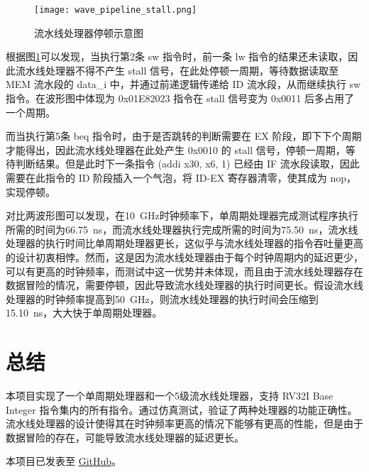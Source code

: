 \documentclass[lang=zh]{sjtuarticle}	%
\begin{document}
\begin{figure}[!htp]
	\centering
	\texttt{[image: wave\_pipeline\_stall.png]}
	\caption{流水线处理器停顿示意图}
	\label{fig:pipeline_stall}
\end{figure}

根据图\ref{fig:pipeline_stall}可以发现，当执行第2条 sw 指令时，前一条 lw 指令的结果还未读取，因此流水线处理器不得不产生 stall 信号，在此处停顿一周期，等待数据读取至 MEM 流水段的 data\_i 中，并通过前递逻辑传递给 ID 流水段，从而继续执行 sw 指令。在波形图中体现为 0x01E82023 指令在 stall 信号变为 0x0011 后多占用了一个周期。

而当执行第5条 beq 指令时，由于是否跳转的判断需要在 EX 阶段，即下下个周期才能得出，因此流水线处理器在此处产生 0x0010 的 stall 信号，停顿一周期，等待判断结果。但是此时下一条指令 (addi x30, x6, 1) 已经由 IF 流水段读取，因此需要在此指令的 ID 阶段插入一个气泡，将 ID-EX 寄存器清零，使其成为 nop，实现停顿。

对比两波形图可以发现，在\SI{10}{\GHz}时钟频率下，单周期处理器完成测试程序执行所需的时间为\SI{66.75}{\ns}，而流水线处理器执行完成所需的时间为\SI{75.50}{\ns}，流水线处理器的执行时间比单周期处理器更长，这似乎与流水线处理器的指令吞吐量更高的设计初衷相悖。然而，这是因为流水线处理器由于每个时钟周期内的延迟更少，可以有更高的时钟频率，而测试中这一优势并未体现，而且由于流水线处理器存在数据冒险的情况，需要停顿，因此导致流水线处理器的执行时间更长。假设流水线处理器的时钟频率提高到\SI{50}{\GHz}，则流水线处理器的执行时间会压缩到\SI{15.10}{\ns}，大大快于单周期处理器。

\section{总结}

本项目实现了一个单周期处理器和一个5级流水线处理器，支持 RV32I Base Integer 指令集内的所有指令。通过仿真测试，验证了两种处理器的功能正确性。流水线处理器的设计使得其在时钟频率更高的情况下能够有更高的性能，但是由于数据冒险的存在，可能导致流水线处理器的延迟更长。

本项目已发表至 \href{https://github.com/ShabbyGayBar/RISCV_CPU}{GitHub}。

\nocite{*}
\printbibliography
\end{document}
